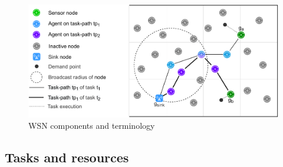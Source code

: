 \newcommand{\setSinkAgents}[2]{\setSymbol{SG}{#1}{#2}}
\newcommand{\formalAgentResources}[2]{
	\functionFormal{ar}
	{\setAgents{}{} \times \setResource{}{}}
	{\setRealNumbersNonNegative{}{}}
}
\newcommand{\functionAgentResources}[2]{
	\functionSignature{ar}{\varAgent{}{}, \varResource{}{}}
}
\newcommand{\formalSinkMapping}[2]{
	\functionFormal{sg}
	{\setCompositeTask{}{}}
	{\powerSetSymbol{\setSinkAgents{#1}{#2}}{}{}}
}



\begin{figure}
\centering 
\includegraphics[width=0.9\linewidth, trim={25pt 0pt 24pt 0pt, clip}]{grid_concept}
\caption[WSN deployment terminology]{WSN components and terminology}
\label{fig:grid_concept}
\end{figure}

\subsection{Tasks and resources}
\label{section:tasks}

